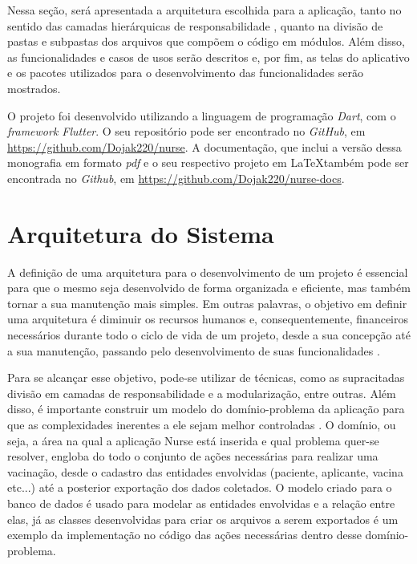 
\label{Cap:Implementacao}
Nessa seção, será apresentada a arquitetura escolhida para a aplicação, tanto no sentido das camadas hierárquicas de responsabilidade \cite{Faust2020}, quanto na divisão de pastas e subpastas dos arquivos que compõem o código em módulos. Além disso, as funcionalidades e casos de usos serão descritos e, por fim, as telas do aplicativo e os pacotes utilizados para o desenvolvimento das funcionalidades serão mostrados.

O projeto foi desenvolvido utilizando a linguagem de programação \textit{Dart}, com o \textit{framework Flutter}. O seu repositório pode ser encontrado no \textit{GitHub}, em \url{https://github.com/Dojak220/nurse}. A documentação, que inclui a versão dessa monografia em formato \textit{pdf} e o seu respectivo projeto em \LaTeX também pode ser encontrada no \textit{Github}, em \url{https://github.com/Dojak220/nurse-docs}.

\section{Arquitetura do Sistema}
\label{cap4:Sec:ArquiteturaSistema}

A definição de uma arquitetura para o desenvolvimento de um projeto é essencial para que o mesmo seja desenvolvido de forma organizada e eficiente, mas também tornar a sua manutenção mais simples. Em outras palavras, o objetivo em definir uma arquitetura é diminuir os recursos humanos e, consequentemente, financeiros necessários durante todo o ciclo de vida de um projeto, desde a sua concepção até a sua manutenção, passando pelo desenvolvimento de suas funcionalidades \cite{martin2019arquitetura}. 

Para se alcançar esse objetivo, pode-se utilizar de técnicas, como as supracitadas divisão em camadas de responsabilidade e a modularização, entre outras. Além disso, é importante construir um modelo do domínio-problema da aplicação para que as complexidades inerentes a ele sejam melhor controladas \cite{evans2017domain}. O domínio, ou seja, a área na qual a aplicação Nurse está inserida e qual problema quer-se resolver, engloba do todo o conjunto de ações necessárias para realizar uma vacinação, desde o cadastro das entidades envolvidas (paciente, aplicante, vacina etc...) até a posterior exportação dos dados coletados. O modelo criado para o banco de dados é usado para modelar as entidades envolvidas e a relação entre elas, já as classes desenvolvidas para criar os arquivos a serem exportados é um exemplo da implementação no código das ações necessárias dentro desse domínio-problema.

